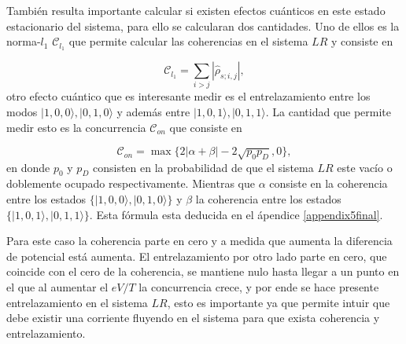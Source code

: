  También resulta importante calcular si existen efectos cuánticos en este estado estacionario del sistema, para ello se calcularan dos cantidades. Uno de ellos es la norma-$l_{1}$ $\mathcal{C}_{l_{1}}$ que permite calcular las coherencias en el sistema $LR$ y consiste en 

\begin{equation*}
    \mathcal{C}_{l_{1}} = \sum_{i> j} |\hat{\rho}_{s;i,j}|,
\end{equation*}
otro efecto cuántico que es interesante medir es el entrelazamiento entre los modos $|1,0,0\rangle,|0,1,0\rangle$ y además entre $|1,0,1\rangle,|0,1,1\rangle$. La cantidad que permite medir esto es la concurrencia $\mathcal{C}_{on}$ \cite{hill1997entanglement,wootters1998entanglement} que consiste en 

\begin{equation*}
    \mathcal{C}_{on} = \max \{ 2|\alpha+\beta| - 2\sqrt{p_{0}p_{D}},0 \},
\end{equation*}
en donde $p_{0}$ y $p_{D}$ consisten en la probabilidad de que el sistema $LR$ este vacío o doblemente ocupado respectivamente. Mientras que $\alpha$ consiste en la coherencia entre los estados $\{|1,0,0\rangle, |0,1,0\rangle \}$ y $\beta$ la coherencia entre los estados  $\{|1,0,1\rangle, |0,1,1\rangle\}$. Esta fórmula esta deducida en el ápendice \ref{appendix5final}. 

    
Para este caso la coherencia parte en cero y a medida que aumenta la diferencia de potencial está aumenta. El entrelazamiento por otro lado parte en cero, que coincide con el cero de la coherencia, se mantiene nulo hasta llegar a un punto en el que al aumentar el $eV/T$ la concurrencia crece, y por ende se hace presente entrelazamiento en el sistema $LR$, esto es importante ya que permite intuir que debe existir una corriente fluyendo en el sistema para que exista coherencia y entrelazamiento.

\label{sec5:transporte}

\newpage

